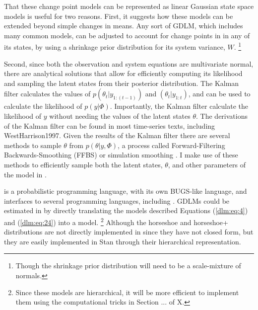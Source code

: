 That these change point models can be represented as linear Gaussian state space models is useful for two reasons.
First, it suggests how these models can be extended beyond simple changes in means.
Any sort of GDLM, which includes many common models, can be adjusted to account for change points in in any of its states, by using a shrinkage prior distribution for its system variance, $W$.%
\footnote{Though the shrinkage prior distribution will need to be a scale-mixture of normals.}

Second, since both the observation and system equations are multivariate normal, there are analytical solutions that allow for efficiently computing its likelihood and sampling the latent states from their posterior distribution.
The Kalman filter calculates the values of $p(\theta_{t} | y_{1:(t-1)})$  and $(\theta_{t}| y_{1:t})$, and can be used to calculate the likelihood of $p(y | \Phi)$.
Importantly, the Kalman filter calculate the likelihood of $y$ without needing the values of the latent states $\theta$.
The derivations of the Kalman filter can be found in most time-series texts, including \textcite[Ch. 5--7]{DurbinKoopman2012}{WestHarrison1997}.
Given the results of the Kalman filter there are several methods to sample $\theta$ from $p(\theta | y, \Phi)$, a process called Forward-Filtering Backwards-Smoothing (FFBS) or simulation smoothing \parencites{CarterKohn1994}{Fruehwirth-Schnatter1994}{DeJongShephard1995}{DurbinKoopman2002}[Ch 4.9]{DurbinKoopman2012}.
I make use of these methods to efficiently sample both the latent states, $\theta$, and other parameters of the model in \Stan{}.

\Stan{} is a probabilistic programming language, with its own BUGS-like language, and interfaces to several programming languages, including \RLang{} \parencites{Stan2015a}{CarpenterGelmanHoffmanEtAl2015a}.
GDLMs could be estimated in \Stan{} by directly translating the models described Equations (\ref{dlm:eq:4}) and (\ref{dlm:eq:24}) into a \Stan{} model.%
\footnote{Since these models are hierarchical, it will be more efficient to implement them using the computational tricks in Section ... of X.}
Although the horseshoe and horseshoe+ distributions are not directly implemented in \Stan{} since they have not closed form, but they are easily implemented in Stan through their hierarchical representation.

